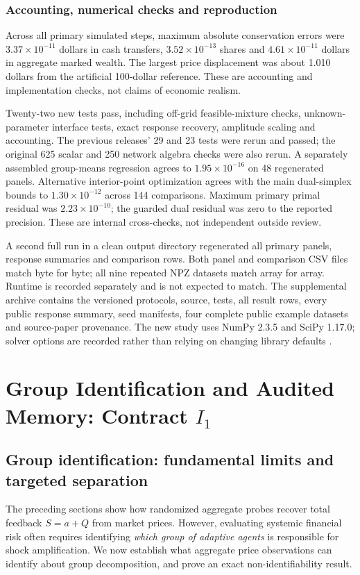 \documentclass[10pt,twocolumn,letterpaper]{article}
\theoremstyle{definition}
\theoremstyle{remark}
\begin{document}
\subsubsection{Accounting, numerical checks and reproduction}
Across all primary simulated steps, maximum absolute conservation errors were $3.37\times10^{-11}$ dollars in cash transfers, $3.52\times10^{-13}$ shares and $4.61\times10^{-11}$ dollars in aggregate marked wealth. The largest price displacement was about 1.010 dollars from the artificial 100-dollar reference. These are accounting and implementation checks, not claims of economic realism.

Twenty-two new tests pass, including off-grid feasible-mixture checks, unknown-parameter interface tests, exact response recovery, amplitude scaling and accounting. The previous releases' 29 and 23 tests were rerun and passed; the original 625 scalar and 250 network algebra checks were also rerun. A separately assembled group-means regression agrees to $1.95\times10^{-16}$ on 48 regenerated panels. Alternative interior-point optimization agrees with the main dual-simplex bounds to $1.30\times10^{-12}$ across 144 comparisons. Maximum primary primal residual was $2.23\times10^{-10}$; the guarded dual residual was zero to the reported precision. These are internal cross-checks, not independent outside review.

A second full run in a clean output directory regenerated all primary panels, response summaries and comparison rows. Both panel and comparison CSV files match byte for byte; all nine repeated NPZ datasets match array for array. Runtime is recorded separately and is not expected to match. The supplemental archive contains the versioned protocols, source, tests, all result rows, every public response summary, seed manifests, four complete public example datasets and source-paper provenance. The new study uses NumPy 2.3.5 and SciPy 1.17.0; solver options are recorded rather than relying on changing library defaults \citep{scipy_highs}.


\section{Group Identification and Audited Memory: Contract \texorpdfstring{$I_1$}{I1}}
\label{sec:ch5}

\subsection{Group identification: fundamental limits and targeted separation}
\label{sec:group_id}
The preceding sections show how randomized aggregate probes recover total feedback $S=a+Q$ from market prices. However, evaluating systemic financial risk often requires identifying \emph{which group of adaptive agents} is responsible for shock amplification. We now establish what aggregate price observations can identify about group decomposition, and prove an exact non-identifiability result.
\end{document}
